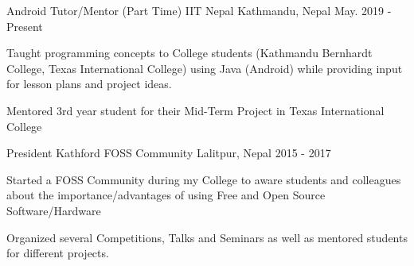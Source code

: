 \begin{cventries}
  \cventry
    {Android Tutor/Mentor (Part Time)} %
    {IIT Nepal} %
    {Kathmandu, Nepal} %
    {May. 2019 - Present} %
    {
      \begin{cvitems} %
        \item {Taught programming concepts to College students (Kathmandu Bernhardt College, Texas International College) using Java (Android) while providing input for lesson plans and project ideas.}
        \item {Mentored 3rd year student for their Mid-Term Project in Texas International College}
      \end{cvitems}
    }
    
  \cventry
    {President} %
    {Kathford FOSS Community} %
    {Lalitpur, Nepal} %
    {2015 - 2017} %
    {
      \begin{cvitems} %
        \item {Started a FOSS Community during my College to aware students and colleagues about the importance/advantages of using Free and Open Source Software/Hardware}
        \item {Organized several Competitions, Talks and Seminars as well as mentored students for different projects.}
      \end{cvitems}
    }
\end{cventries}
